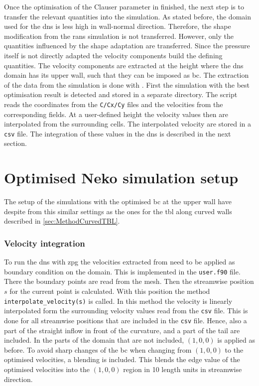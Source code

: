 Once the optimisation of the Clauser parameter in  finished, the next step is to transfer the relevant quantities into the  simulation.
As stated before, the domain used for the \acrshort{dns} is less high in wall-normal direction. 
Therefore, the shape modification from the \acrshort{rans} simulation is not transferred.
However, only the quantities influenced by the shape adaptation are transferred.
Since the pressure itself is not directly adapted the velocity components build the defining quantities.
The velocity components are extracted at the height where the \acrshort{dns} domain has its upper wall, such that they can be imposed as \acrshort{bc}.
The extraction of the data from the  simulation is done with .
First the simulation with the best optimisation result is detected and stored in a separate directory.
The  script reads the coordinates from the \texttt{C/Cx/Cy} files and the velocities from the corresponding fields. 
At a user-defined height the velocity values then are interpolated from the surrounding cells. 
The interpolated velocity are stored in a \texttt{csv} file. 
The integration of these values in the \acrshort{dns} is described in the next section.

\newpage
\section{Optimised Neko simulation setup}

The setup of the simulations with the optimised \acrshort{bc} at the upper wall have despite from this similar settings as the ones for the \acrshort{tbl} along curved walls described in \autoref{sec:MethodCurvedTBL}.

\subsubsection{Velocity integration}

To run the \acrshort{dns} with \acrshort{zpg} the velocities extracted from  need to be applied as boundary condition on the  domain. 
This is implemented in the \texttt{user.f90} file. 
There the boundary points are read from the mesh. 
Then the streamwise position $s$ for the current point is calculated.
With this position the method \texttt{interpolate_velocity(s)} is called.
In this method the velocity is linearly interpolated form the surrounding velocity values read from the \texttt{csv} file.
This is done for all streamwise positions that are included in the \texttt{csv} file. 
Hence, also a part of the straight inflow in front of the curvature, and a part of the tail are included.
In the parts of the domain that are not included, $(1,0,0)$ is applied as before. 
To avoid sharp changes of the \acrshort{bc} when changing from $(1,0,0)$ to the optimised velocities, a blending is included.
This blends the edge value of the optimised velocities into the $(1,0,0)$ region in 10 length units in streamwise direction. 


